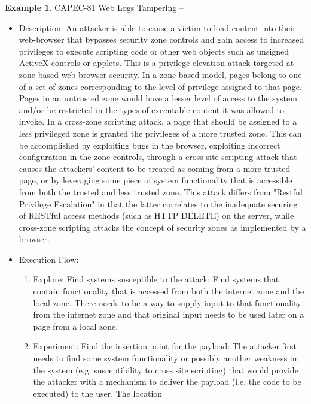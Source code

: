 \documentclass{article}
\theoremstyle{definition}
\theoremstyle{corollary}
\theoremstyle{lemma}
\theoremstyle{theorem}
\theoremstyle{theorem}
\newtheorem{example}{Example}
\begin{document}
\begin{example}	CAPEC-81\autocite{CAPEC-81} Web Logs Tampering --
	\begin{itemize}
		\item Description: An attacker is able to cause a victim to
			load content into their web-browser that bypasses
			security zone controls and gain access to increased
			privileges to execute scripting code or other web
			objects such as unsigned ActiveX controls or applets.
			This is a privilege elevation attack targeted at
			zone-based web-browser security. In a zone-based model,
			pages belong to one of a set of zones corresponding to
			the level of privilege assigned to that page. Pages in
			an untrusted zone would have a lesser level of access
			to the system and/or be restricted in the types of
			executable content it was allowed to invoke. In a
			cross-zone scripting attack, a page that should be
			assigned to a less privileged zone is granted the
			privileges of a more trusted zone. This can be
			accomplished by exploiting bugs in the browser,
			exploiting incorrect configuration in the zone
			controls, through a cross-site scripting attack that
			causes the attackers' content to be treated as coming
			from a more trusted page, or by leveraging some piece
			of system functionality that is accessible from both
			the trusted and less trusted zone. This attack differs
			from "Restful Privilege Escalation" in that the latter
			correlates to the inadequate securing of RESTful access
			methods (such as HTTP DELETE) on the server, while
			cross-zone scripting attacks the concept of security
			zones as implemented by a browser. 
		\item Execution Flow: 
			\begin{enumerate}
				\item Explore: Find systems susceptible to the
					attack: Find systems that contain
					functionality that is accessed from
					both the internet zone and the local
					zone. There needs to be a way to supply
					input to that functionality from the
					internet zone and that original input
					needs to be used later on a page from a
					local zone. 
				\item Experiment: Find the insertion point for
					the payload: The attacker first needs
					to find some system functionality or
					possibly another weakness in the system
					(e.g. susceptibility to cross site
					scripting) that would provide the
					attacker with a mechanism to deliver
					the payload (i.e. the code to be
					executed) to the user. The location

\end{enumerate}
\end{itemize}
\end{example}
\end{document}
